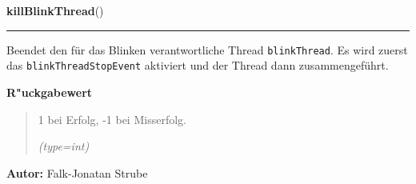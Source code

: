 \hspace{.8\funcindent}\begin{boxedminipage}{\funcwidth}

    \raggedright \textbf{killBlinkThread}()

    \vspace{-1.5ex}

    \rule{\textwidth}{0.5\fboxrule}
\setlength{\parskip}{2ex}
    Beendet den für das Blinken verantwortliche Thread 
    \texttt{blinkThread}. Es wird zuerst das \texttt{blinkThreadStopEvent} 
    aktiviert und der Thread dann zusammengeführt.

\setlength{\parskip}{1ex}
      \textbf{R"uckgabewert}
    \vspace{-1ex}

      \begin{quote}
      1 bei Erfolg, -1 bei Misserfolg.

      {\it (type=int)}

      \end{quote}

\textbf{Autor:} Falk-Jonatan Strube



    \end{boxedminipage}

    \label{ledleuchtturm:ledFunc:changeState}

    \vspace{0.5ex}

